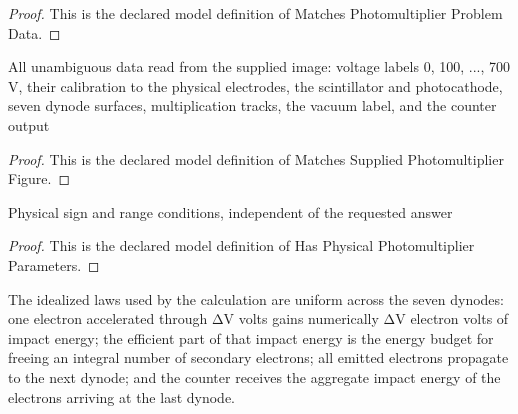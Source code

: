 \begin{proof}
  This is the declared model definition of Matches Photomultiplier Problem Data.
\end{proof}
\begin{definition}
  \label{def:physics:phyx-mini-0539:phyxminiproblems-problemphyxmini0539-matchessuppliedphotomultiplierfigure}
  All unambiguous data read from the supplied image: voltage labels 0, 100, ..., 700 V, their calibration to the physical electrodes, the scintillator and photocathode, seven dynode surfaces, multiplication tracks, the vacuum label, and the counter output
\end{definition}
\begin{proof}
  This is the declared model definition of Matches Supplied Photomultiplier Figure.
\end{proof}
\begin{definition}
  \label{def:physics:phyx-mini-0539:phyxminiproblems-problemphyxmini0539-hasphysicalphotomultiplierparameters}
  Physical sign and range conditions, independent of the requested answer
\end{definition}
\begin{proof}
  This is the declared model definition of Has Physical Photomultiplier Parameters.
\end{proof}
\begin{definition}
  \label{def:physics:phyx-mini-0539:phyxminiproblems-problemphyxmini0539-satisfiesidealphotomultiplierlaws}
  The idealized laws used by the calculation are uniform across the seven dynodes: one electron accelerated through ΔV volts gains numerically ΔV electron volts of impact energy; the efficient part of that impact energy is the energy budget for freeing an integral number of secondary electrons; all emitted electrons propagate to the next dynode; and the counter receives the aggregate impact energy of the electrons arriving at the last dynode.
\end{definition}
